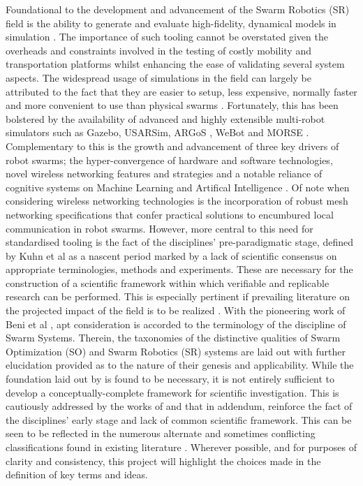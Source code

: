 \documentclass{report}
\begin{document}
Foundational to the development and advancement of the Swarm Robotics (SR) field is the ability to generate and evaluate high-fidelity, dynamical models in simulation \cite{Taylor2014}. The importance of such tooling cannot be overstated given the overheads and constraints involved in the testing of costly mobility and transportation platforms whilst enhancing the ease of validating several system aspects. The widespread usage of simulations in the field can largely be attributed to the fact that they are easier to setup, less expensive, normally faster and more convenient to use than physical swarms \cite{WeBot2004}. Fortunately, this has been bolstered by the availability of advanced and highly extensible multi-robot simulators such as Gazebo, USARSim, ARGoS \cite{Pinciroli2014}, WeBot and MORSE \cite{Morse2011}. Complementary to this is the growth and advancement of three key drivers of robot swarms; the hyper-convergence of hardware and software technologies, novel wireless networking features and strategies and a notable reliance of cognitive systems on Machine Learning and Artifical Intelligence \cite{Yang2018}. Of note when considering wireless networking technologies is the incorporation of robust mesh networking specifications \cite{Blue2018} that confer practical solutions to encumbured local communication in robot swarms. However, more central to this need for standardised tooling is the fact of the disciplines' pre-paradigmatic stage, defined by Kuhn et al \cite{Kuhn2015} as a nascent period marked by a lack of scientific consensus on appropriate terminologies, methods and experiments. These are necessary for the construction of a scientific framework within which verifiable and replicable research can be performed. This is especially pertinent if prevailing literature on the projected impact of the field is to be realized \cite{Yang2018}. With the pioneering work of Beni et al \cite{Beni2005a}, apt consideration is accorded to the terminology of the discipline of Swarm Systems. Therein, the taxonomies of the distinctive qualities of Swarm Optimization (SO) and Swarm Robotics (SR) systems are laid out with further elucidation provided as to the nature of their genesis and applicability. While the foundation laid out by \cite{Beni2005a} is found to be necessary, it is not entirely sufficient to develop a conceptually-complete framework for scientific investigation. This is cautiously addressed by the works of \cite{Iocchi2001} and \cite{Sahin2005} that in addendum, reinforce the fact of the disciplines' early stage and lack of common scientific framework. This can be seen to be reflected in the numerous alternate and sometimes conflicting classifications found in existing literature \cite{Tan2013}. Wherever possible, and for purposes of clarity and consistency, this project will highlight the choices made in the definition of key terms and ideas.
\end{document}
